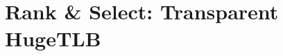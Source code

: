 \documentclass{article}
\begin{document}
%

\section*{Rank \& Select: Transparent HugeTLB}
\end{document}
